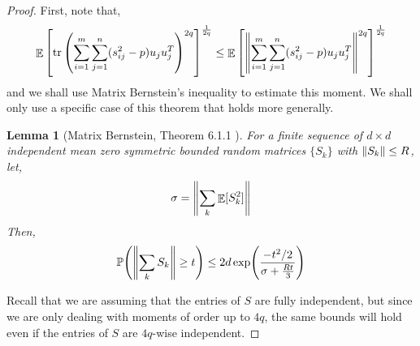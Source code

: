\documentclass[11pt]{amsart}
\numberwithin{equation}{section}
\numberwithin{equation}{section}
\DeclareMathOperator{\E}{\mathbb{E}}
\DeclareMathOperator*{\tr}{tr}
\def \P {\mathbb{P}}
\DeclarePairedDelimiter{\norm}{\lVert}{\rVert}
\DeclarePairedDelimiter{\paren}{(}{)}
\newtheorem{lemma}[theorem]{Lemma}
\theoremstyle{remark}
\theoremstyle{definition}
\begin{document}
\begin{proof}
    First, note that, 
    \[ \E \left[ \tr \left( \sum_{i=1}^m \sum_{j =1}^n (s_{ij}^2 - p)u_ju_{j}^T \right)^{2q} \right]^\frac{1}{2q} \le \E \left[  \norm*{\sum_{i=1}^m \sum_{j =1}^n (s_{ij}^2 - p)u_ju_{j}^T}^{2q} \right]^\frac{1}{2q} \]
    and we shall use Matrix Bernstein's inequality to estimate this moment. We shall only use a specific case of this theorem that holds more generally. 
    \begin{lemma}[Matrix Bernstein, Theorem 6.1.1 \cite{troppmatrixconc}]
        For a finite sequence of $d \times d$ independent mean zero symmetric bounded random matrices $\{ S_k \}$ with $\norm{S_k} \le R$, let,
        $$\sigma = \norm*{\sum_k \E[S^2_k]}$$
        Then,
        \[ \P \paren*{ \norm*{\sum_k S_k} \ge t } \le 2d \exp \paren*{\frac{-t^2/2}{\sigma + \frac{Rt}{3}}} \]
    \end{lemma}
    Recall that we are assuming that the entries of $S$ are fully independent, but since we are only dealing with moments of order up to $4q$, the same bounds will hold even if the entries of $S$ are $4q$-wise independent.
    

\end{proof}
\end{document}
